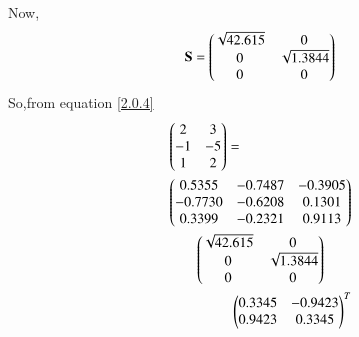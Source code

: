 \documentclass[journal,12pt,twocolumn]{IEEEtran}
\begin{document}
$$Now,
\begin{align}
\vec{S}=\myvec{\sqrt{42.615}&0\\0&\sqrt{1.3844}\\0&0}
\end{align}
So,from equation \eqref{2.0.4}
\begin{align}
\begin{multlined}
\myvec{2&3\\-1&-5\\1&2}=\\
\myvec{0.5355&-0.7487&-0.3905\\-0.7730&-0.6208&0.1301\\0.3399&-0.2321&0.9113}\\
\myvec{\sqrt{42.615}&0\\0&\sqrt{1.3844}\\0&0}\\\myvec{0.3345&-0.9423\\0.9423&0.3345}^T
\end{multlined}
\end{align}
 
\end{document}
